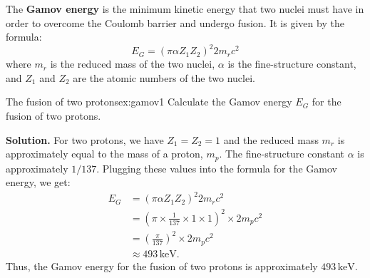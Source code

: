 \begin{foundation}
The \textbf{Gamov energy} is the minimum kinetic energy that two nuclei must have in order to overcome the Coulomb barrier and undergo fusion. It is given by the formula:
\begin{equation}    
E_G = (\pi \alpha Z_1 Z_2)^2 2 m_{r}c^2
\end{equation} 
where $m_r$ is the reduced mass of the two nuclei, $\alpha$ is the fine-structure constant, and $Z_1$ and $Z_2$ are the atomic numbers of the two nuclei.
\end{foundation}
\begin{example}{The fusion of two protons}{ex:gamov1}
Calculate the Gamov energy $E_G$ for the fusion of two protons.

\smallskip\textbf{Solution.}
For two protons, we have $Z_1 = Z_2 = 1$ and the reduced mass $m_r$ is approximately equal to the mass of a proton, $m_p$. The fine-structure constant $\alpha$ is approximately $1/137$. Plugging these values into the formula for the Gamov energy, we get:
\begin{align*}
E_G &= (\pi \alpha Z_1 Z_2)^2 2 m_{r}c^2 \\
&= (\pi \times \frac{1}{137} \times 1 \times 1)^2 \times 2 m_p c^2 \\
&= \left(\frac{\pi}{137}\right)^2 \times 2 m_p c^2 \\
&\approx 493\,\text{keV}.
\end{align*}
Thus, the Gamov energy for the fusion of two protons is approximately $493\,\text{keV}$.
\end{example}

